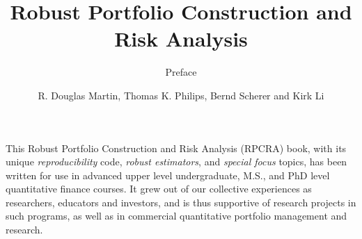 \documentclass[graybox,envcountchap,sectrefs]{svmono}\usepackage[]{graphicx}\usepackage[]{xcolor}
\begin{document}
\title{Robust Portfolio Construction and Risk Analysis}
\author{R. Douglas Martin, Thomas K. Philips, Bernd Scherer and Kirk Li}
\subtitle{Preface}

\maketitle
\newpage{}


This Robust Portfolio Construction and Risk Analysis (RPCRA) book,
with its unique \emph{reproducibility} code, \emph{robust estimators},
and \emph{special focus} topics, has been written for use in advanced
upper level undergraduate, M.S., and PhD level quantitative finance
courses. It grew out of our collective experiences as researchers,
educators and investors, and is thus supportive of research projects
in such programs, as well as in commercial quantitative portfolio
management and research.
\end{document}
